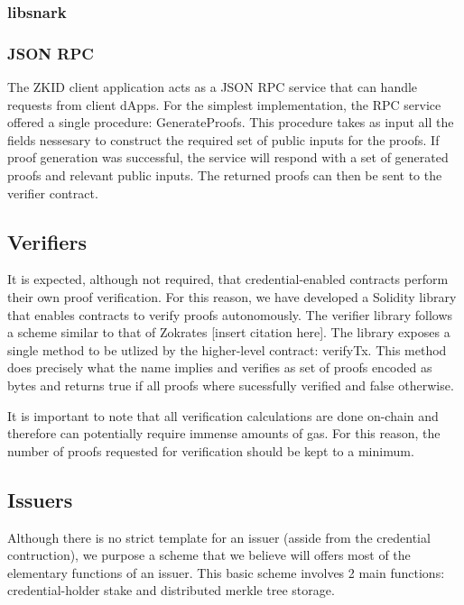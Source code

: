 \documentclass[11 pt]{extarticle}
\theoremstyle{remark}
\begin{document}
\subsubsection{libsnark}

\subsubsection{JSON RPC}

The ZKID client application acts as a JSON RPC service that can handle requests from client dApps. For the simplest implementation,
the RPC service offered a single procedure: GenerateProofs. This procedure takes as input all the fields nessesary
to construct the required set of public inputs for the proofs. If proof generation was successful, the service will respond with a 
set of generated proofs and relevant public inputs. The returned proofs can then be sent to the verifier contract.  

\subsection{Verifiers}

It is expected, although not required, that credential-enabled contracts perform their own proof verification. For this reason, we have
developed a Solidity library that enables contracts to verify proofs autonomously. The verifier library follows a scheme similar to that
of Zokrates [insert citation here]. The library exposes a single method to be utlized by the higher-level contract: verifyTx. This 
method does precisely what the name implies and verifies as set of proofs encoded as bytes and returns true if all proofs where sucessfully
verified and false otherwise. 

It is important to note that all verification calculations are done on-chain and therefore can potentially require immense amounts of gas.
For this reason, the number of proofs requested for verification should be kept to a minimum. 

\subsection{Issuers}

Although there is no strict template for an issuer (asside from the credential contruction), we purpose a scheme that we believe
will offers most of the elementary functions of an issuer. This basic scheme involves 2 main functions:
credential-holder stake and distributed merkle tree storage.
\end{document}
